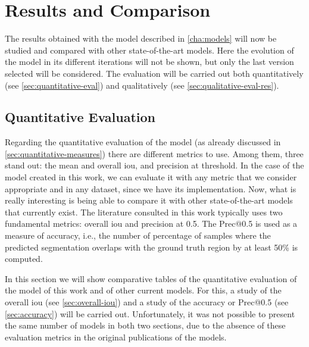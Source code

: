 

\chapter{Results and Comparison}\label{cha:results}



The results obtained with the model described in \vref{cha:models} will now be
studied and compared with other state-of-the-art models. Here the evolution of
the model in its different iterations will not be shown, but only the last
version selected will be considered. The evaluation will be carried out both
quantitatively (see \vref{sec:quantitative-eval}) and qualitatively (see
\vref{sec:qualitative-eval-res}).



\section{Quantitative Evaluation}\label{sec:quantitative-eval}

Regarding the quantitative evaluation of the model (as already discussed in
\vref{sec:quantitative-measures}) there are different metrics to use. Among
them, three stand out: the mean and overall \gls{iou}, and precision at
threshold. In the case of the model created in this work, we can evaluate it
with any metric that we consider appropriate and in any dataset, since we have
its implementation. Now, what is really interesting is being able to compare it
with other state-of-the-art models that currently exist. The literature
consulted in this work typically uses two fundamental metrics: overall
\gls{iou} and precision at 0.5. The Prec@0.5 is used as a measure of accuracy,
i.e., the number of percentage of samples where the predicted segmentation
overlaps with the ground truth region by at least 50\% is computed.

In this section we will show comparative tables of the quantitative evaluation
of the model of this work and of other current models. For this, a study of the
overall \gls{iou} (see \vref{sec:overall-iou}) and a study of the accuracy or
Prec@0.5 (see \vref{sec:accuracy}) will be carried out. Unfortunately, it was
not possible to present the same number of models in both two sections, due to
the absence of these evaluation metrics in the original publications of the
models.


